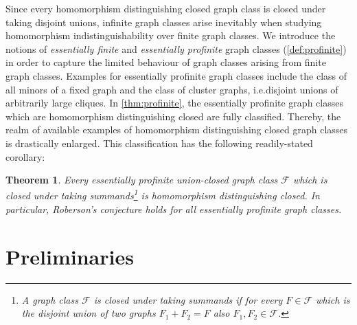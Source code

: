 \documentclass[3p,final]{elsarticle}
\newtheorem{theorem}{Theorem}
\begin{document}
	Since every homomorphism distinguishing closed graph class is closed under taking disjoint unions, infinite graph classes arise inevitably when studying homomorphism indistinguishability over finite graph classes.
	We introduce the notions of \emph{essentially finite} and \emph{essentially profinite} graph classes (\cref{def:profinite}) in order to capture the limited behaviour of graph classes arising from finite graph classes.
	Examples for essentially profinite graph classes include the class of all minors of a fixed graph and the class of cluster graphs, i.e.\@ disjoint unions of arbitrarily large cliques.
	In \cref{thm:profinite}, the essentially profinite graph classes which are homomorphism distinguishing closed are fully classified. 
	Thereby, the realm of available examples of homomorphism distinguishing closed graph classes is drastically enlarged.
	This classification has the following readily-stated corollary:

	
	\begin{theorem} \label{thm:main3}
		Every essentially profinite union-closed graph class $\mathcal{F}$ which is closed under taking summands\footnote{A graph class $\mathcal{F}$ is \emph{closed under taking summands} if for every $F \in \mathcal{F}$ which is the disjoint union of two graphs $F_1 + F_2 = F$ also $F_1, F_2 \in \mathcal{F}$.} is homomorphism distinguishing closed.
		In particular, Roberson's conjecture holds for all essentially profinite graph classes.
	\end{theorem}


	\section{Preliminaries}
	
\end{document}
